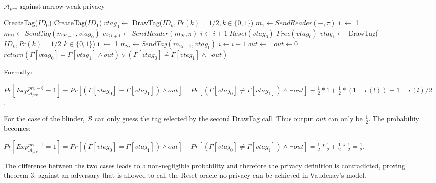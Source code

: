     \begin{algorithm}[H] %
        \centering
        \caption{$\mathcal{A}_{prv}$ against narrow-weak privacy}
        \begin{algorithmic}[1] %
            \State CreateTag($ID_0$)
            \State CreateTag($ID_1$)
            \State $vtag_{0} \leftarrow$ DrawTag($ID_k, Pr(k)= 1/2, k \in \{0,1\}$) 
            \State $m_1 \leftarrow SendReader(-,\pi)$ 
            \State i $\leftarrow$ 1
                \State $m_{2i} \gets SendTag(m_{2i-1}, vtag_{0})$
                \State $m_{2i+1} \gets SendReader(m_{2i}, \pi)$
                \State $i \gets i+1$
            \EndWhile
            \State $Reset(vtag_{0})$
            \State $Free(vtag_{0})$
            \State $vtag_{1} \leftarrow$ DrawTag($ID_k, Pr(k)= 1/2, k \in \{0,1\}$) 
            \State i $\leftarrow$ 1
                \State $m_{2i} \gets SendTag(m_{2i-1}, vtag_{1})$
                \State $i \gets i+1$
            \EndWhile       
                \State $out \leftarrow 1$
            \Else
                \State $out \leftarrow 0$
            \EndIf
            \State $return (\Gamma[vtag_{0}] = \Gamma[vtag_{1}] \land out) \lor 
                (\Gamma[vtag_{0}] \neq \Gamma[vtag_{1}] \land \lnot out)$
        \end{algorithmic}
    \end{algorithm}

    Formally:

    $Pr[Exp_{\mathcal{A}_{prv}}^{prv-0} = 1] = Pr[(\Gamma[vtag_{0}] = \Gamma[vtag_{1}]) \land out] + Pr[(\Gamma[vtag_{0}] \neq \Gamma[vtag_{1}]) \land \lnot out] = 
        \frac{1}{2}*1+\frac{1}{2}*(1-\epsilon(l)) = 1-\epsilon(l)/2$.
    
    For the case of the blinder, $\mathcal{B}$ can only guess the tag selected by the second DrawTag call. Thus output $out$ can only be $\frac{1}{2}.$ The probability becomes:

    $Pr[Exp_{\mathcal{A}_{prv}}^{prv-1} = 1] = Pr[(\Gamma[vtag_{0}] = \Gamma[vtag_{1}]) \land out] + Pr[(\Gamma[vtag_{0}] \neq \Gamma[vtag_{1}]) \land \lnot out] = 
        \frac{1}{2}*\frac{1}{2}+\frac{1}{2}*\frac{1}{2} = \frac{1}{2}$.

    The difference between the two cases leads to a non-negligible probability and therefore the privacy definition is contradicted, proving theorem 3: against an adversary that is allowed to call the 
    Reset oracle no privacy can be achieved in Vaudenay's model.

